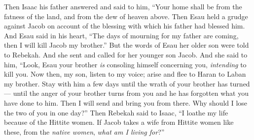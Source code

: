 \begin{biblechapter}
\verse Then Isaac his father answered and said to him,
\verse “Your home shall be from the fatness of the land, 
and from the dew of heaven above.
\verse Then Esau held a grudge against Jacob on account of the blessing with which his father had blessed him. And Esau said in his heart, “The days of mourning for my father are coming, then I will kill Jacob my brother.”
\verse But the words of Esau her older son were told to Rebekah. And she sent and called for her younger son Jacob. And she said to him, “Look, Esau your brother \textit{is} consoling himself concerning you, \textit{intending} to kill you.
\verse Now then, my son, listen to my voice; arise and flee to Haran to Laban my brother.
\verse Stay with him a few days until the wrath of your brother has turned—
\verse until the anger of your brother turns from you and he has forgotten what you have done to him. Then I will send and bring you from there. Why should I lose the two of you in one day?”
\verse Then Rebekah said to Isaac, “I loathe my life because of the Hittite women. If Jacob takes a wife from Hittite women like these, from the \textit{native women}, \textit{what am I living for}?”
\end{biblechapter}

